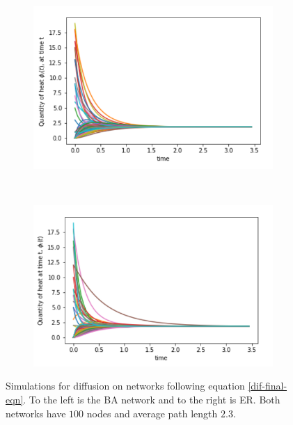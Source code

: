 \documentclass[10pt,a4paper]{article}
\theoremstyle{plain}
\theoremstyle{definition}
\begin{document}
     \begin{figure}[H]
     	\centering
     	\begin{subfigure}[b]{0.45\textwidth}
     		\includegraphics[width=\textwidth]{images/Barabasi-normalDiffusion.png}
     		\caption{}
     		\label{barabasi-normal}
     	\end{subfigure}~
     	\begin{subfigure}[b]{0.45\textwidth}
     		\includegraphics[width= \textwidth]{images/E-R-normalDiffusion.png}
     		\caption{}
     		\label{ER-normal}
     	\end{subfigure}
        \caption{Simulations for diffusion on networks following equation \ref{dif-final-eqn}. To the left is the BA network and to the right is ER. Both networks have $100$ nodes and average path length $2.3$. }
     	\label{barabasi-Erdos-compare}
     \end{figure}
\end{document}
